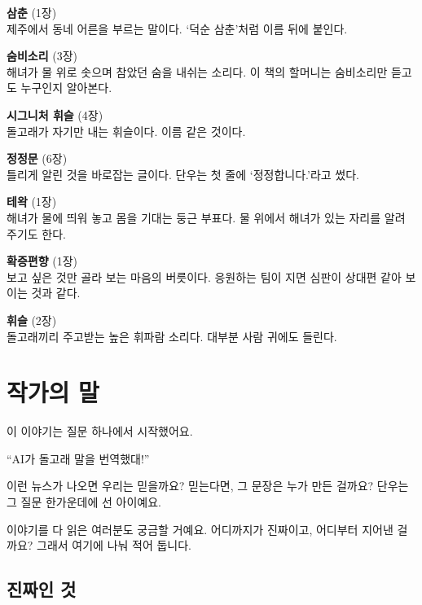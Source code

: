 \documentclass[
  korean,
  letterpaper,
  twoside,
  open=any,
  fontsize=12.5pt,
  headings=small]{scrbook}
\newcommand{\backmatterstyle}{\setlength{\parindent}{0pt}\setlength{\parskip}{0.45em plus 0.1em}\backmattersize}
\newcommand{\backmattersize}{\fontsize{10.5pt}{16.5pt}\selectfont}
\begin{document}
\textbf{삼춘} (1장)\\
제주에서 동네 어른을 부르는
말이다. `덕순 삼춘'처럼 이름
뒤에 붙인다.

\textbf{숨비소리} (3장)\\
해녀가 물 위로 솟으며 참았던
숨을 내쉬는 소리다. 이 책의
할머니는 숨비소리만 듣고도
누구인지 알아본다.

\textbf{시그니처 휘슬} (4장)\\
돌고래가 자기만 내는 휘슬이다.
이름 같은 것이다.

\textbf{정정문} (6장)\\
틀리게 알린 것을 바로잡는
글이다. 단우는 첫 줄에
`정정합니다.'라고 썼다.

\textbf{테왁} (1장)\\
해녀가 물에 띄워 놓고 몸을
기대는 둥근 부표다. 물 위에서
해녀가 있는 자리를 알려 주기도
한다.

\textbf{확증편향} (1장)\\
보고 싶은 것만 골라 보는
마음의 버릇이다. 응원하는 팀이
지면 심판이 상대편 같아 보이는
것과 같다.

\textbf{휘슬} (2장)\\
돌고래끼리 주고받는 높은
휘파람 소리다. 대부분 사람
귀에도 들린다.


\chapter*{작가의
말}\label{uxc791uxac00uxc758-uxb9d0}


\backmatterstyle

이 이야기는 질문 하나에서
시작했어요.

``AI가 돌고래 말을 번역했대!''

이런 뉴스가 나오면 우리는
믿을까요? 믿는다면, 그 문장은
누가 만든 걸까요? 단우는 그
질문 한가운데에 선 아이예요.

이야기를 다 읽은 여러분도
궁금할 거예요. 어디까지가
진짜이고, 어디부터 지어낸
걸까요? 그래서 여기에 나눠
적어 둡니다.

\section*{진짜인
것}\label{uxc9c4uxc9dcuxc778-uxac83-1}

\end{document}
